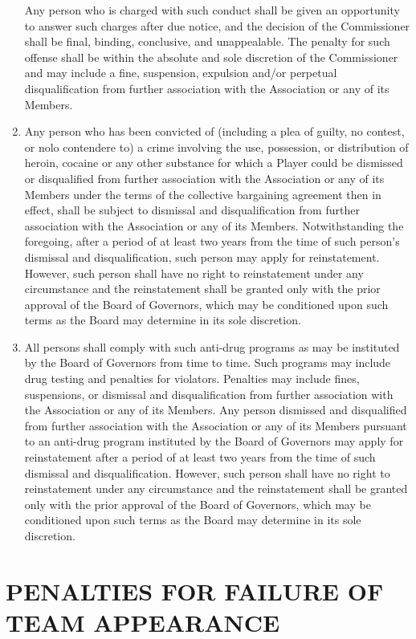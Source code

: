 \documentclass[]{book}
\begin{document}
\begin{enumerate}
  Any person who is charged with such conduct shall be given an opportunity to answer such charges after due notice, and the decision of the Commissioner shall be final, binding, conclusive, and unappealable. The penalty for such offense shall be within the absolute and sole discretion of the Commissioner and may include a fine, suspension, expulsion and/or perpetual disqualification from further association with the Association or any of its Members.
\item
  Any person who has been convicted of (including a plea of guilty, no contest, or nolo contendere to) a crime involving the use, possession, or distribution of heroin, cocaine or any other substance for which a Player could be dismissed or disqualified from further association with the Association or any of its Members under the terms of the collective bargaining agreement then in effect, shall be subject to dismissal and disqualification from further association with the Association or any of its Members. Notwithstanding the foregoing, after a period of at least two years from the time of such person's dismissal and disqualification, such person may apply for reinstatement. However, such person shall have no right to reinstatement under any circumstance and the reinstatement shall be granted only with the prior approval of the Board of Governors, which may be conditioned upon such terms as the Board may determine in its sole discretion.
\item
  All persons shall comply with such anti-drug programs as may be instituted by the Board of Governors from time to time. Such programs may include drug testing and penalties for violators. Penalties may include fines, suspensions, or dismissal and disqualification from further association with the Association or any of its Members. Any person dismissed and disqualified from further association with the Association or any of its Members pursuant to an anti-drug program instituted by the Board of Governors may apply for reinstatement after a period of at least two years from the time of such dismissal and disqualification. However, such person shall have no right to reinstatement under any circumstance and the reinstatement shall be granted only with the prior approval of the Board of Governors, which may be conditioned upon such terms as the Board may determine in its sole discretion.
\end{enumerate}

\hypertarget{penalties-for-failure-of-team-appearance}{%
\section{PENALTIES FOR FAILURE OF TEAM APPEARANCE}\label{penalties-for-failure-of-team-appearance}}
\end{document}
